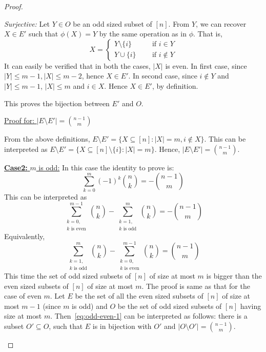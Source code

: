 \begin{proof}
\begin{description}
\begin{description}
\item \textit{Surjective:} Let $Y\in O$ be an odd sized subset of $[n]$. From $Y$, we can recover $X\in E'$ such that $\phi(X) = Y$ by the same operation as in $\phi$. That is, 
 \[
 X= 
 \begin{cases}
Y\setminus \{i\} & ~~~~~\text{ if } i\in Y\\
Y\cup\{i\} & ~~~~~\text{ if } i\not\in Y
 \end{cases}
 \]
 It can easily be verified that in both the cases, $|X|$ is even. 
 In first case, since $|Y|\le m-1, |X|\le m-2$, hence $X\in E'$. In second case, since $i\not\in Y$ and $|Y|\le m-1$, $|X|\le m$ and $i\in X$. Hence $X\in E'$, by definition.
\end{description}
This proves the bijection between $E'$ and $O$. 

\underline{Proof for: $|E\setminus E'| = {n-1\choose m}$}

From the above definitions, $E\setminus E' = \{X\subseteq [n]: |X| = m, i\not\in X\}$. This can be interpreted as $E\setminus E' = \{X\subseteq [n]\setminus \{i\}: |X| = m\}$. Hence, $|E\setminus E'| = {n-1\choose m}$.

\item \underline{\textbf{Case2:} $m$ is odd:} In this case the identity to prove is:
\begin{equation}
\label{eq:even-odd-3}
    \sum_{k=0}^m (-1)^k{n\choose k} = - {n-1\choose m}
\end{equation}
This can be interpreted as 
\begin{equation}
\label{eq:even-odd-2}
    \sum_{\substack{k=0,\\k\text{ is even}}}^{m-1} {n\choose k} -  \sum_{\substack{k=1,\\k\text{ is odd}}}^{m} {n\choose k} = -{n-1\choose m}
\end{equation}
Equivalently,
\begin{equation}
\label{eq:odd-even-1}
    \sum_{\substack{k=1,\\k\text{ is odd}}}^{m} {n\choose k} - \sum_{\substack{k=0,\\k\text{ is even}}}^{m-1} {n\choose k}  = {n-1\choose m}
\end{equation}
This time the set of odd sized subsets of $[n]$ of size at most $m$ is bigger than the even sized subsets of $[n]$ of size at most $m$.
The proof is same as that for the case of even $m$. 
Let $E$ be the set of all the even sized subsets of $[n]$ of size at most $m-1$ (since $m$ is odd) and $O$ be the set of odd sized subsets of $[n]$ having size at most $m$. Then~\eqref{eq:odd-even-1} can be interpreted as follows: there is a subset $O'\subseteq O$, such that $E$ is in bijection with $O'$ and $|O\setminus O'| = {n-1\choose m}$.
  

\end{description}
\end{proof}

